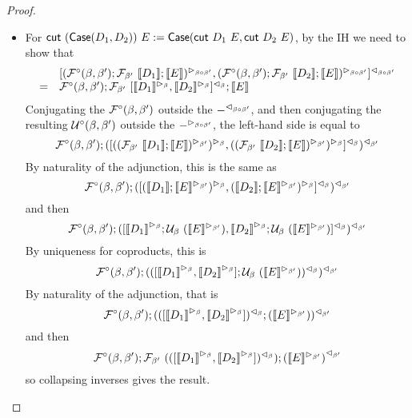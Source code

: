 \documentclass{drl-common/llncs}
\renewcommand{\sem}[1]{\ensuremath{ \llbracket #1 \rrbracket}}
\newcommand\compo[2]{\ensuremath{#1 \circ #2}}
\newcommand\cutsym{\ensuremath{\dsd{cut}}}
\newcommand\cut[2]{\ensuremath{{\cutsym \,\, #1 \,\, #2}}}
\newcommand\Case[2]{\ensuremath{\dsd{Case}(#1,#2)}}
\begin{document}
\begin{proof}
\begin{itemize}
\begin{itemize}
\item For $\cut{(\Case{D_1}{D_2})}{E} := \Case{\cut{D_1}{E}}{\cut{D_2}{E}}$,
by the IH we need to show that
\[
\begin{array}{ll}
& {\semrtol{\semcase{\semltor{(\semofcut{D_1}{E})}{\compo{\beta}{\beta'}}}{\semltor{(\semofcut{D_2}{E})}{\compo{\beta}{\beta'}}}}{\compo{\beta}{\beta'}}}\\
= &\semFcomp(\beta,\beta');\semF{\beta'}{{\semrtol{\semcase{\semltor{\sem{D_1}}{\beta}}{\semltor{\sem{D_2}}{\beta}}}{\beta}}};\sem{E}
\end{array}
\]
Conjugating the $\mathcal{F}^\circ(\beta,\beta')$ outside the
$\semrtol{-}{\compo{\beta}{\beta'}}$, and then conjugating the resulting 
$\mathcal{U}^\circ(\beta,\beta')$ outside the $\semltor{-}{\compo{\beta}{\beta'}}$,
the left-hand side is equal to
\[
\semFcomp(\beta,\beta');
\semrtol{(\semrtol{\semcase{\semltor{(\semltor{(\semF{\beta'}{\sem{D_1}};\sem{E})}{\beta'})}{\beta}}{\semltor{(\semltor{(\semF{\beta'}{\sem{D_2}};\sem{E})}{\beta'})}{\beta}}}{\beta})}{\beta'}
\]
By naturality of the adjunction, this is the same as 
\[
\semFcomp(\beta,\beta');
\semrtol{(\semrtol{\semcase{\semltor{({\sem{D_1}};\semltor{\sem{E}}{\beta'})}{\beta}}{\semltor{({\sem{D_2}};\semltor{\sem{E}}{\beta'})}{\beta}}}{\beta})}{\beta'}
\]
and then
\[
\semFcomp(\beta,\beta');
\semrtol{(\semrtol{\semcase{\semltor{{\sem{D_1}}}{\beta};\semU{\beta}{(\semltor{\sem{E}}{\beta'})}}
                           {\semltor{{\sem{D_2}}}{\beta};\semU{\beta}{(\semltor{\sem{E}}{\beta'})}}}
  {\beta})}{\beta'}
\]
By uniqueness for coproducts, this is
\[
\semFcomp(\beta,\beta');
\semrtol{(\semrtol{(\semcase{\semltor{{\sem{D_1}}}{\beta}}
                           {\semltor{{\sem{D_2}}}{\beta}};\semU{\beta}{(\semltor{\sem{E}}{\beta'})})}
  {\beta})}{\beta'}
\]
By naturality of the adjunction, that is
\[
\semFcomp(\beta,\beta');
\semrtol{(\semrtol{(\semcase{\semltor{{\sem{D_1}}}{\beta}}
                           {\semltor{{\sem{D_2}}}{\beta}})}
  {\beta};{(\semltor{\sem{E}}{\beta'})})}{\beta'}
\]
and then
\[
\semFcomp(\beta,\beta');
\semF{\beta'}{
(\semrtol{(\semcase{\semltor{{\sem{D_1}}}{\beta}}
                           {\semltor{{\sem{D_2}}}{\beta}})}
  {\beta})};
\semrtol{{(\semltor{\sem{E}}{\beta'})}}{\beta'}
\]
so collapsing inverses gives the result.  

\end{itemize}


\end{itemize}
\end{proof}
\end{document}
